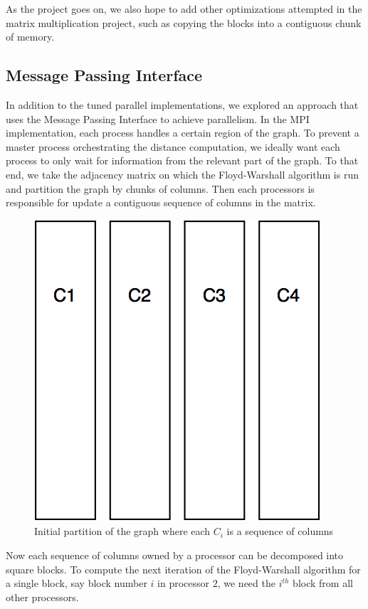 \documentclass[11pt]{article}
\begin{document}
As the project goes on, we also hope to add other optimizations attempted in the matrix multiplication project, such as copying the blocks into a contiguous chunk of memory. \\

\subsection{Message Passing Interface}\label{sec:mpi}

In addition to the tuned parallel implementations, we explored an approach that uses the Message Passing Interface to achieve parallelism. In the MPI implementation, each process handles a certain region of the graph. To prevent a master process orchestrating the distance computation, we ideally want each process to only wait for information from the relevant part of the graph. To that end, we take the adjacency matrix on which the Floyd-Warshall algorithm is run and partition the graph by chunks of columns. Then each processors is responsible for update a contiguous sequence of columns in the matrix.

\begin{figure}[H]
\centering
\includegraphics[scale=0.25]{initial_partition.png}
\caption{Initial partition of the graph where each $C_i$ is a sequence of columns}
\label{fig:init_part}
\end{figure}

Now each sequence of columns owned by a processor can be decomposed into square blocks. To compute the next iteration of the Floyd-Warshall algorithm for a single block, say block number $i$ in processor $2$, we need the $i^{th}$ block from all other processors.
\end{document}
